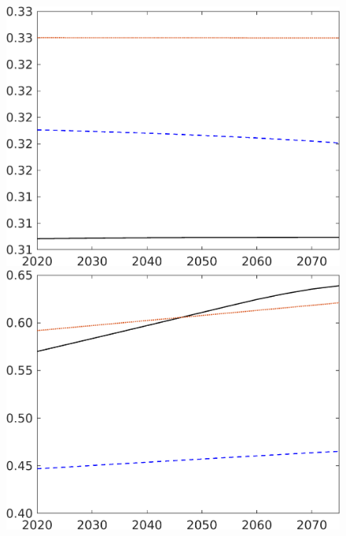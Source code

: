 \begin{figure}[h!!]
\begin{minipage}[]{0.32\textwidth}
\end{minipage}
	\begin{minipage}[]{0.32\textwidth}
		\includegraphics[width=1\textwidth]{../../codding_model/own_basedOnFried/optimalPol_elastS_DisuSci/figures/all_1705/Extern_CompEff_hl_spillover0_noskill0_sep1_BN0_ineq0_red0_etaa0.79_lgd0.png}
	\end{minipage}
	\begin{minipage}[]{0.32\textwidth}
		\includegraphics[width=1\textwidth]{../../codding_model/own_basedOnFried/optimalPol_elastS_DisuSci/figures/all_1705/Extern_CompEff_C_spillover0_noskill0_sep1_BN0_ineq0_red0_etaa0.79_lgd0.png}
	\end{minipage}
\end{figure}

